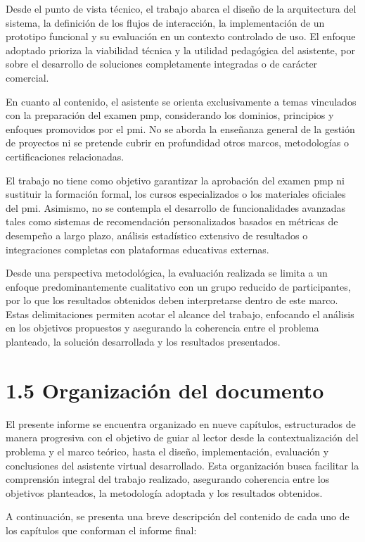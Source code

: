 Desde el punto de vista técnico, el trabajo abarca el diseño de la arquitectura del sistema, la definición de los flujos de interacción, la implementación de un prototipo funcional y su evaluación en un contexto controlado de uso. El enfoque adoptado prioriza la viabilidad técnica y la utilidad pedagógica del asistente, por sobre el desarrollo de soluciones completamente integradas o de carácter comercial.

En cuanto al contenido, el asistente se orienta exclusivamente a temas vinculados con la preparación del examen \gls{pmp}, considerando los dominios, principios y enfoques promovidos por el \gls{pmi}. No se aborda la enseñanza general de la gestión de proyectos ni se pretende cubrir en profundidad otros marcos, metodologías o certificaciones relacionadas.

El trabajo no tiene como objetivo garantizar la aprobación del examen \gls{pmp} ni sustituir la formación formal, los cursos especializados o los materiales oficiales del \gls{pmi}. Asimismo, no se contempla el desarrollo de funcionalidades avanzadas tales como sistemas de recomendación personalizados basados en métricas de desempeño a largo plazo, análisis estadístico extensivo de resultados o integraciones completas con plataformas educativas externas.

Desde una perspectiva metodológica, la evaluación realizada se limita a un enfoque predominantemente cualitativo con un grupo reducido de participantes, por lo que los resultados obtenidos deben interpretarse dentro de este marco. Estas delimitaciones permiten acotar el alcance del trabajo, enfocando el análisis en los objetivos propuestos y asegurando la coherencia entre el problema planteado, la solución desarrollada y los resultados presentados.

\section{1.5 Organización del documento}
El presente informe se encuentra organizado en nueve capítulos, estructurados de manera progresiva con el objetivo de guiar al lector desde la contextualización del problema y el marco teórico, hasta el diseño, implementación, evaluación y conclusiones del asistente virtual desarrollado. Esta organización busca facilitar la comprensión integral del trabajo realizado, asegurando coherencia entre los objetivos planteados, la metodología adoptada y los resultados obtenidos.

A continuación, se presenta una breve descripción del contenido de cada uno de los capítulos que conforman el informe final:

